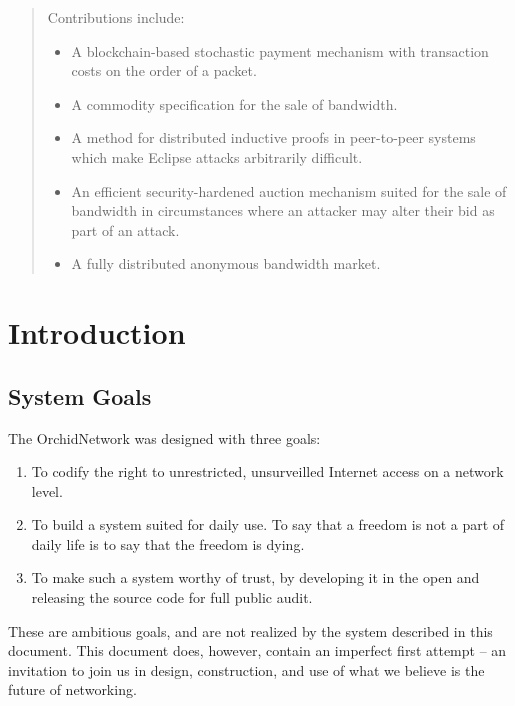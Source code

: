 \documentclass{article}
\newcommand{\orchid}{Orchid}
\newcommand{\Orchid}{\orchid}
\begin{document}
\begin{abstract}
  Contributions include:

  \begin{itemize}
  \item A blockchain-based stochastic payment mechanism with
    transaction costs on the order of a packet.
  \item A commodity specification for the sale of bandwidth.
  \item A method for distributed inductive proofs in peer-to-peer
    systems which make Eclipse attacks arbitrarily difficult.
  \item An efficient security-hardened auction mechanism suited for
    the sale of bandwidth in circumstances where an attacker may alter
    their bid as part of an attack.
  \item A fully distributed anonymous bandwidth market.
  \end{itemize}

\end{abstract}


\newpage
\tableofcontents
\newpage


\section{Introduction}
\label{sec:overview}

\subsection{System Goals}

The \Orchid Network was designed with three goals:

\begin{enumerate}
\item To codify the right to unrestricted, unsurveilled Internet access on a network level.
\item To build a system suited for daily use. To say that a freedom is not a part of daily life is to say that the freedom is dying.
\item To make such a system worthy of trust, by developing it in the open and releasing the source code for full public audit.
\end{enumerate}

These are ambitious goals, and are not realized by the system described in this document. This document does, however, contain an imperfect first attempt – an invitation to join us in design, construction, and use of what we believe is the future of networking.
\end{document}
